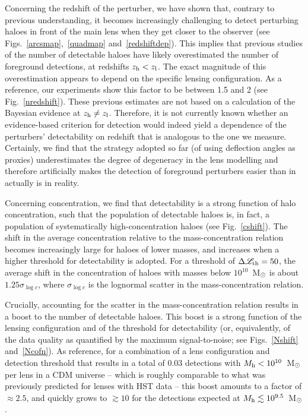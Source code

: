 \documentclass[a4paper, fleqn, usenatbib, useAMS]{mnras}
\def\DL{\Delta\mathscr{L}}
\begin{document}
Concerning the redshift of the perturber, we have shown that, contrary to previous understanding,
it becomes increasingly challenging to detect perturbing haloes in front of the main lens 
when they get closer to the observer (see Figs.~\ref{arcsmap},~\ref{quadmap} and~\ref{redshiftdep}). This implies that previous studies of the number of detectable haloes
have likely overestimated the number of foreground detections, at redshifts $z_{\rm h}<z_{\rm l}$. 
The exact magnitude of this overestimation appears to depend on the specific lensing 
configuration. As a reference, our experiments show this factor to be between 1.5 and 2 (see Fig.~\ref{nredshift}). 
These previous estimates are not based on a calculation of the Bayesian
evidence at $z_{\rm h}\neq z_{\rm l}$. Therefore, it is not currently
known whether an evidence-based criterion for detection would indeed
yield a dependence of the perturbers’ detectability on redshift that
is analogous to the one we measure. Certainly, we find that the
strategy adopted so far (of using deflection angles as proxies)
underestimates the degree of degeneracy in the lens modelling and
therefore artificially makes the detection of foreground perturbers 
easier {than in actually is in reality.} 

Concerning concentration, we find that detectability is a strong function of 
halo concentration, such that the population of detectable haloes is, in fact, a population
of systematically high-concentration haloes (see
Fig.~\ref{cshift}). The shift in the average concentration  
relative to the mass-concentration relation becomes increasingly
large for haloes of lower masses, and increases when a higher threshold
for detectability is adopted. For a threshold of $\DL_{\rm th}=50$,
the average shift in the concentration of haloes with masses below $10^{10}$~M$_{\rm \odot}$
is about $1.25\sigma_{\log c}$, where $\sigma_{\log c}$ is the lognormal scatter in the
mass-concentration relation. 

Crucially, accounting for the scatter in the 
mass-concentration relation results in a boost to the number of detectable haloes.
This boost is a strong function of the lensing configuration and of the threshold for detectability (or, equivalently, of the data quality as quantified by the maximum signal-to-noise; see Figs.~\ref{Nshift} and~\ref{Ncofn}).
As reference, for a combination of a lens configuration and  detection threshold 
that results in a total of 0.03 detections with $M_{\rm h} < 10^{10}$~M$_{\rm \odot}$ per lens in a CDM universe -- 
which is roughly comparable to what was previously predicted for lenses with HST data -- this boost 
amounts to a factor of $\approx 2.5$, and quickly grows to $\gtrsim10$ for the detections 
expected at $M_{\rm h} \lesssim 10^{9.5}$~M$_{\rm \odot}$.
\end{document}
